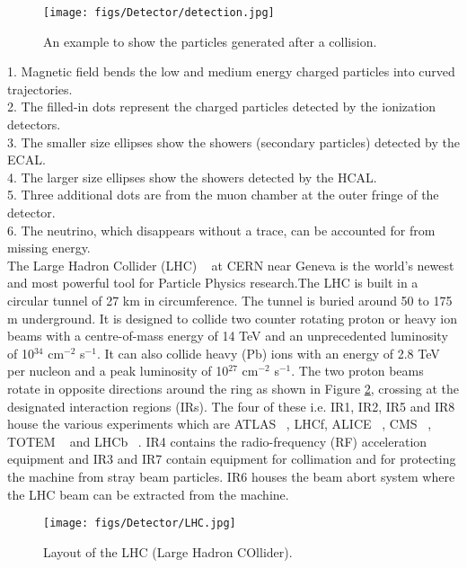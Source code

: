 \begin{figure}[h!]
\begin{center} 
\texttt{[image: figs/Detector/detection.jpg]}
\caption{An example to show the particles generated after a collision.}
\label{detection}
\end{center}
\end{figure} 

1. Magnetic field bends the low and medium energy charged particles into curved trajectories.\\
2. The filled-in dots represent the charged particles detected by the ionization detectors.\\
3. The smaller size ellipses show the showers (secondary particles) detected by the ECAL.\\
4. The larger size ellipses show the showers detected by the HCAL.\\
5. Three additional dots are from the muon chamber at the outer fringe of the detector.\\
6. The neutrino, which disappears without a trace, can be accounted for from missing energy.\\


The Large Hadron Collider (LHC) ~\cite{LHC} at CERN near Geneva is the world's newest and most powerful tool for Particle Physics research.The LHC is built in a circular tunnel of 27 km in circumference. The tunnel is buried around 50 to 175 m underground. It is designed to collide two counter rotating proton or heavy ion beams with a centre-of-mass energy of 14 TeV and an unprecedented luminosity of 10$^{34}$ cm$^{-2}$ s$^{-1}$. It can also collide heavy (Pb) ions with an energy of 2.8 TeV per nucleon and a peak luminosity of 10$^{27}$ cm$^{-2}$ s$^{-1}$. The two proton beams rotate in opposite directions around the ring as shown in Figure \ref{LHC}, crossing at the designated interaction regions (IRs). The four of these i.e. IR1, IR2, IR5 and IR8 house the various experiments which are ATLAS ~\cite{ATLAS}, LHCf, ALICE ~\cite{ALICE}, CMS ~\cite{CMS}, TOTEM ~\cite{TOTEM} and LHCb ~\cite{LHCb}. IR4 contains the radio-frequency (RF) acceleration equipment and IR3 and IR7 contain equipment for collimation and for protecting the machine from stray beam particles. IR6 houses the beam abort system where the LHC beam can be extracted from the machine. 

\begin{figure}[h!]
\begin{center} 
\texttt{[image: figs/Detector/LHC.jpg]}
\caption{Layout of the LHC (Large Hadron COllider).}
\label{LHC}
\end{center}
\end{figure} 

